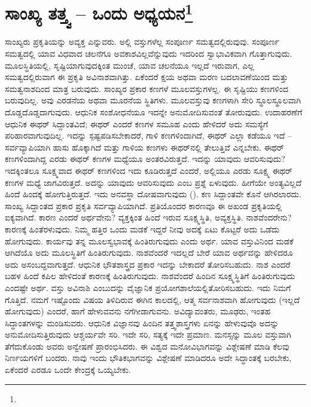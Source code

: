 
\chapter[ಸಾಂಖ್ಯ ತತ್ತ್ವ – ಒಂದು ಅಧ್ಯಯನ]{ಸಾಂಖ್ಯ ತತ್ತ್ವ – ಒಂದು ಅಧ್ಯಯನ\protect\footnote{}}

ಸಾಂಖ್ಯರು ಪ್ರಕೃತಿಯನ್ನು ಅವ್ಯಕ್ತ ಎನ್ನುವರು. ಅಲ್ಲಿ ವಸ್ತುಗಳೆಲ್ಲ ಸಂಪೂರ್ಣ ಸಮತ್ವದಲ್ಲಿರುವುವು. ಸಂಪೂರ್ಣ ಸಮತ್ವದಲ್ಲಿ ಯಾವ ವಿಧವಾದ ಚಲನೆಗೂ ಅವಕಾಶವಿಲ್ಲವೆನ್ನುವುದು ಇದರಿಂದ ಸ್ವಾಭಾವಿಕವಾಗಿ ಗೊತ್ತಾಗುವುದು. ಮೂಲಸ್ಥಿತಿಯಲ್ಲಿ, ಸೃಷ್ಟಿಯಾಗುವುದಕ್ಕಿಂತ ಮುಂಚೆ, ಯಾವ ಚಲನೆಯೂ ಇಲ್ಲದೆ ಇರುವಾಗ, ಎಲ್ಲ ಸಮತ್ವದಲ್ಲಿರುವಾಗ ಈ ಪ್ರಕೃತಿ ಅವಿನಾಶವಾಗಿತ್ತು. ಏಕೆಂದರೆ ಕ್ಷಯ ಅಥವಾ ಮರಣ ಬದಲಾವಣೆಯಿಂದ ಮತ್ತು ಸಮತ್ವನಾಶದಿಂದ ಮಾತ್ರ ಬರುವುದು. ಸಾಂಖ್ಯರ ಪ್ರಕಾರ ಕಣಗಳೆ ಮೂಲವಸ್ತುಗಳಲ್ಲ. ಈ ಸೃಷ್ಟಿಯು ಕಣಗಳಿಂದ ಬರುವುದಿಲ್ಲ. ಅವು ಎರಡನೆಯ ಅಥವಾ ಮೂರನೆಯ ಸ್ಥಿತಿಗಳು. ಮೂಲವಸ್ತುವು ಕಣಗಳಾಗಿ ಸೇರಿ ಸ್ಥೂಲಸ್ಥೂಲವಾಗಿ ದೊಡ್ಡದೊಡ್ಡದಾಗುವುದು. ಆಧುನಿಕ ಸಂಶೋಧನೆಯೂ ಇದನ್ನೇ ಅನುಮೋದಿಸುವಂತೆ ತೋರುವುದು. ಉದಾಹರಣೆಗೆ ಆಧುನಿಕ ಈಥರ್ ಸಿದ್ದಾಂತವಿದೆ; ಈಥರ್ ಎಂದರೆ ಕಣಗಳ ಸಮೂಹ ಎಂದು ಹೇಳಿದರೆ ಅದು ಸಮಸ್ಯೆಗೆ ಪರಿಹಾರವಾಗುವುದಿಲ್ಲ. ಇದನ್ನು ಸ್ಪಷ್ಟಪಡಿಸಬೇಕಾದರೆ, ಗಾಳಿ ಕಣಗಳಿಂದಾಗಿದೆ, ಈಥರ್‌ ಎಲ್ಲಾ ಕಡೆಯೂ ಇದೆ – ಸರ್ವವ್ಯಾಪಿಯಾಗಿ ಹಾಸು ಹೊಕ್ಕಾಗಿದೆ ಮತ್ತು ಗಾಳಿಯ ಕಣಗಳು ಈಥರ್‌ನಲ್ಲಿ ತೇಲುತ್ತಿವೆ ಎನ್ನಬೇಕು. ಈಥರ್ ಕಣಗಳಿಂದಾಗಿದ್ದ ಎರಡು ಈಥರ್ ಕಣಗಳ ಮಧ್ಯೆಯೂ ಅಂತರವಿರುತ್ತದೆ. ಇದನ್ನು ಯಾವುದು ಆವರಿಸುವುದು? ಇದಕ್ಕಿಂತಲೂ ಸೂಕ್ಷ್ಮವಾದ ಈಥರ್ ಕಣಗಳಿಂದ ಇದು ಕೂಡಿರುತ್ತದೆ ಎಂದರೆ, ಅಲ್ಲಿಯೂ ಎರಡು ಸೂಕ್ಷ್ಮ ಈಥರ್ ಕಣಗಳ ಮಧ್ಯೆ ಜಾಗವಿರುತ್ತದೆ. ಅದನ್ನು ಯಾವುದು ಆವರಿಸುವುದು ಎಂಬ ಪ್ರಶ್ನೆ ಏಳುವುದು. ಹೀಗೆಯೇ ಅಂತ್ಯವಿಲ್ಲದೆ ಹಿಂದೆ ಹಿಂದಕ್ಕೆ ಹೋಗುತ್ತಿರುತ್ತದೆ. ಇದು ಅನವಸ್ಥಾ ದೋಷವಾಗುವುದು (). ಕಣ ಸಿದ್ದಾಂತವೇ ಕೊನೆ ಆಗಿರಲಾರದು. ಸಾಂಖ್ಯ ಸಿದ್ದಾಂತದ ಪ್ರಕಾರ ಪ್ರಕೃತಿ ಸರ್ವವ್ಯಾಪಿಯಾಗಿದೆ. ಪ್ರತಿಯೊಂದರ ಕಾರಣವೂ ಈ ಅಖಂಡ ಪ್ರಕೃತಿಯಲ್ಲಿ ಐಕ್ಯವಾಗಿದೆ. ಕಾರಣ ಎಂದರೆ ಅರ್ಥವೇನು? ವ್ಯಕ್ತಕ್ಕಿಂತ ಹಿಂದೆ ಇರುವ ಸೂಕ್ಷ್ಮಸ್ಥಿತಿ, ಅವ್ಯಕ್ತಸ್ಥಿತಿ. ನಾಶವೆಂದರೇನು? ಕಾರಣಕ್ಕೆ ಹಿಂತೆರಳುವುದು. ನಿಮ್ಮ ಹತ್ತಿರ ಒಂದು ಮಡಕೆ ಇದ್ದರೆ ನೀವು ಅದಕ್ಕೆ ಏಟು ಕೊಟ್ಟರೆ ಅದು ಒಡೆದು ಹೋಗುವುದು. ಕಾರ್ಯವು ತನ್ನ ಮೂಲಸ್ವಭಾವಕ್ಕೆ ಹಿಂತಿರುಗುವುದು ಎಂದು ಅರ್ಥ. ಯಾವ ವಸ್ತುವಿನಿಂದ ಮಡಕೆ ಆಗಿದೆಯೊ ಅದು ಮೂಲಸ್ಥಿತಿಗೆ ಹಿಂತಿರುಗುವುದು. ನಾಶವೆಂದರೆ ಇದಲ್ಲದೆ ಬೇರೆ ಯಾವ ಅರ್ಥವನ್ನು ಹೇಳಿದರೂ ಅದು ಅಸಂಬದ್ದವಾಗುತ್ತದೆ. ಆಧುನಿಕ ಭೌತಶಾಸ್ತ್ರದ ಪ್ರಕಾರ ಇದನ್ನು ಬೇಕಾದರೆ ತೋರಿಸಬಹುದು. ನಾಶ ಎಂದರೆ ಬಹಳ ಹಿಂದೆ ಕಪಿಲ ಹೇಳಿದಂತೆ ಕಾರಣಕ್ಕೆ ಹಿಂತಿರುಗುವುದು. ನಾಶವೆಂದರೆ ಹಿಂದಿನ ಸೂಕ್ಷ್ಮಸ್ಥಿತಿಗೆ ಹಿಂತಿರುಗುವುದು ಎಂದಷ್ಟೇ ಅರ್ಥ. ವಸ್ತು ಅವಿನಾಶಿ ಎಂಬುದನ್ನು ವೈಜ್ಞಾನಿಕ ಪ್ರಯೋಗಶಾಲೆಯಲ್ಲಿ\break ತೋರಿಸಬಹುದು. ಇದು ನಿಮಗೆ ಗೊತ್ತಿದೆ. ನಮಗೆ ಇಷ್ಟೊಂದು ವಿಷಯ ತಿಳಿದಿರುವ ಈಗಿನ ಕಾಲದಲ್ಲಿ, ಆತ್ಮ ಸರ್ವನಾಶವಾಗಿ ಹೋಗುವುದು (ಇಲ್ಲದೆ ಹೋಗುವುದು) ಎಂದರೆ, ಹಾಗೆ ಹೇಳುವವನು ನಗೆಗೀಡಾಗುವನು. ಅವಿದ್ಯಾವಂತರು, ಮೂಢರು, ಇಂತಹ ಸಿದ್ಧಾಂತಗಳನ್ನು ಮಂಡಿಸುವರು. ಆಧುನಿಕ ವಿಜ್ಞಾನವು ಹಿಂದಿನ ತತ್ತ್ವಶಾಸ್ತ್ರಗಳು ಏನನ್ನು ಹೇಳುವುವೊ ಅದನ್ನು ಅನುಮೋದಿಸುತ್ತಿರುವುದು ಆಶ್ಚರ್ಯವೇ ಸರಿ. ಇದೇ ಸರಿ, ಸತ್ಯಕ್ಕೆ ಇದೇ ಪ್ರಮಾಣ. ಮನಸ್ಸನ್ನು ಮೂಲ ವಸ್ತುವಾಗಿ ತೆಗೆದುಕೊಂಡು ಅವರು ಅನ್ವೇಷಣೆ ಪ್ರಾರಂಭಿಸಿದರು. ಈ ವಿಶ್ವದ ಮನೋವಿಭಾಗವನ್ನು ವಿಶ್ಲೇಷಣೆ ಮಾಡಿ ಕೆಲವು ನಿರ್ಣಯಗಳಿಗೆ ಬಂದರು. ನಾವು ಇಂದು ಭೌತಿಕಭಾಗವನ್ನು ವಿಶ್ಲೇಷಣೆ ಮಾಡಿದರೂ ಅದೇ ಸಿದ್ಧಾಂತಕ್ಕೆ ಬರಬೇಕು, ಏಕೆಂದರೆ ಎರಡೂ ಒಂದೇ ಕೇಂದ್ರಕ್ಕೆ ಒಯ್ಯಬೇಕು.

